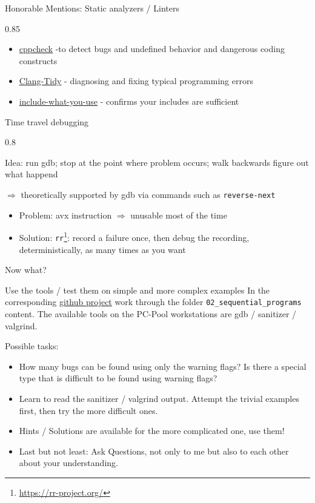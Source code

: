 \documentclass[aspectratio=1610]{beamer}
\newenvironment{centeredblock}[2][0.8\textwidth]
{ %
	\begin{center}
		\begin{varwidth}{#1} %
			\begin{block}{#2}
				\centering
			}
			{ %
			\end{block}
		\end{varwidth}
	\end{center}
}
\begin{document}
	\begin{frame}[fragile]{Honorable Mentions: Static analyzers / Linters}
		
		\begin{centeredblock}[0.85 \textwidth]{}
			\begin{itemize}
				\item \href{https://cppcheck.sourceforge.io/}{cppcheck} -to detect bugs and undefined behavior and dangerous coding constructs
				\item \href{https://clang.llvm.org/extra/clang-tidy/}{Clang-Tidy} - diagnosing and fixing typical programming errors
				\item \href{https://include-what-you-use.org/}{include-what-you-use} - confirms your includes are sufficient
			\end{itemize}
		\end{centeredblock}
	\end{frame}
	
	\begin{frame}[fragile]{Time travel debugging}
		\begin{centeredblock}{}
			Idea: run gdb; stop at the point where problem occurs; walk backwards figure out what happend
			
			$\Rightarrow$ theoretically supported by gdb via commands such as \texttt{reverse-next}
			\begin{itemize}
				\item Problem: avx instruction $\Rightarrow$ unusable most of the time
				\item Solution: \texttt{rr}\footnote{\href{rr}{https://rr-project.org/}}: record a failure once, then debug the recording, deterministically, as many times as you want
			\end{itemize}
		\end{centeredblock}
	\end{frame}

\begin{frame}[fragile]{Now what?}
	\begin{block}{Use the tools / test them on simple and more complex examples}
		In the corresponding \href{https://github.com/joscao/cpp-debugging}{github project} work through the folder \texttt{02\_sequential\_programs} content. The available tools on the PC-Pool workstations are gdb / sanitizer / valgrind.
	
		\vspace{1cm}
	
		Possible tasks:
		\begin{itemize}
			\item How many bugs can be found using only the warning flags? Is there a special type that is difficult to be found using warning flags?
			\item Learn to read the sanitizer / valgrind output. Attempt the trivial examples first, then try the more difficult ones.
			\item Hints / Solutions are available for the more complicated one, use them!
			\item Last but not least: Ask Questions, not only to me but also to each other about your understanding.
		\end{itemize}
	\end{block}
\end{frame}
\end{document}

